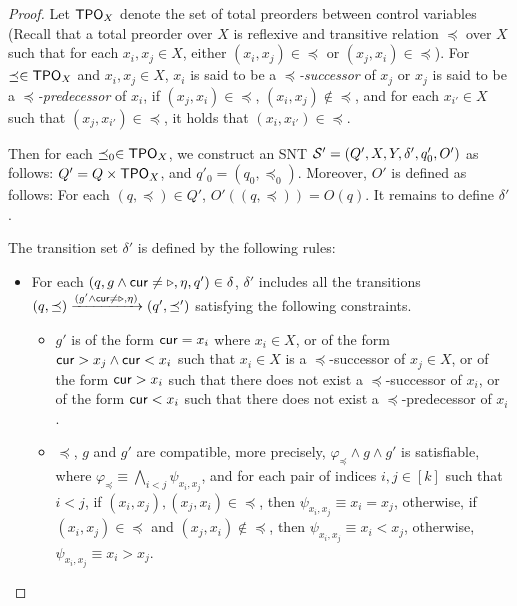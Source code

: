 \begin{appendix}
\begin{proof}
Let $\mathsf{TPO}_{X}$ denote the set of total preorders between control variables (Recall that a total preorder over $X$ is reflexive and transitive relation $\preceq$  over $X$ such that for each $x_i, x_j \in X$, either $(x_i, x_j) \in \preceq$ or $(x_j, x_i) \in \preceq$). For $\preceq \in \mathsf{TPO}_X$ and $x_i, x_j \in X$,  $x_i$ is said to be a \emph{$\preceq$-successor} of  $x_j$ or $x_j$ is said to be a \emph{$\preceq$-predecessor} of $x_i$, if $(x_j, x_i) \in \preceq$, $(x_i, x_j) \not \in \preceq$, and for each $x_{i'} \in X$ such that $(x_j, x_{i'}) \in \preceq$, it holds that $(x_i, x_{i'}) \in \preceq$. 

Then for each $\preceq_0 \in \mathsf{TPO}_X$, we construct an SNT ${\mathcal{S} }'= (Q', X, Y, \delta', q'_0, O')$ as follows: $Q'= Q \times \mathsf{TPO}_X$, and $q'_0=(q_0,  \preceq_0)$. Moreover, $O'$ is defined as follows: For each $(q, \preceq) \in Q'$, $O'((q, \preceq)) = O(q)$. It remains to define $\delta'$.

The transition set $\delta'$ is defined by the following rules:
\begin{itemize}
\item For each $(q, g \wedge \mathsf{cur} \neq \triangleright, \eta, q') \in \delta$, $\delta'$ includes all the transitions $(q, \preceq) \xrightarrow{(g' \wedge \mathsf{cur} \neq \triangleright, \eta)} (q', \preceq')$ satisfying the following constraints. 

\begin{itemize}
\item  $g'$ is of the form $\mathsf{cur} = x_i$ where $x_i \in X$, or of the form $\mathsf{cur} > x_j \wedge \mathsf{cur} < x_i$ such that $x_i \in X$ is a $\preceq$-successor of $x_j \in X$, or of the form $\mathsf{cur} > x_i$ such that there does not exist a $\preceq$-successor of $x_i$, or of the form $\mathsf{cur} < x_i$ such that there does not exist a $\preceq$-predecessor of $x_i$.
%
\item $\preceq$, $g$ and $g'$ are compatible, more precisely, $\varphi_{\preceq} \wedge g \wedge g'$ is satisfiable, where $\varphi_{\preceq} \equiv \bigwedge \limits_{ i< j} \psi_{x_i, x_j}$, and for each pair of indices $i, j \in [k]$ such that $i < j$,  if $(x_i, x_j), (x_j, x_i) \in \preceq$, then $\psi_{x_i, x_j} \equiv x_i = x_j$, otherwise, if $(x_i, x_j) \in \preceq$ and $(x_j, x_i) \not \in \preceq$, then $\psi_{x_i, x_j} \equiv x_i < x_j$, otherwise, $\psi_{x_i, x_j} \equiv x_i > x_j$. 


\end{itemize}
\end{itemize}
\end{proof}
\end{appendix}

